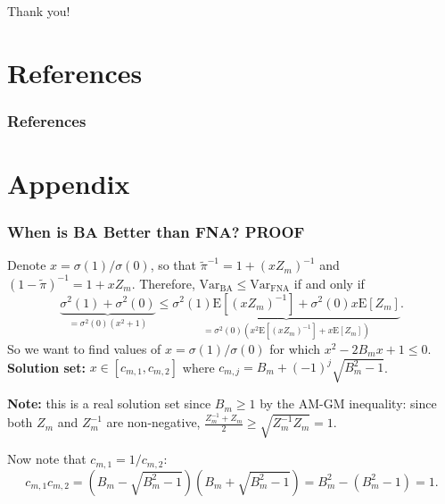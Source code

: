 \documentclass[aspectratio=169, 10pt]{beamer}
\theoremstyle{definition}
\theoremstyle{plain}
\def\E{\mathrm{E}}
\def\Var{\mathrm{Var}}
\def\FNA{\mathrm{FNA}}
\def\BA{\mathrm{BA}}
\begin{document}
\begin{frame}
\centering
\Large Thank you!
\end{frame}

\section*{References}

\begin{frame}
\frametitle{References}
{\sloppy \printbibliography}
\end{frame}

\section*{Appendix}

\begin{frame}
\frametitle{When is BA Better than FNA? PROOF
\hyperlink{frm--when-is-ba-better}{}}
\label{frm--prf--when-is-ba-better}
Denote \(x = \sigma (1) / \sigma (0)\), so that
\(\tilde{\pi}^{-1} = 1 + (x Z_{m})^{-1}\) and \((1 -
\tilde{\pi})^{-1} = 1 + x Z_{m}\).
Therefore, \(\Var_{\BA} \leq \Var_{\FNA}\) if and only if
\begin{equation*}
  \underbrace{\sigma^{2} (1) + \sigma^{2} (0)}_{= \sigma^{2} (0) (x^{2} + 1)}
  \leq \underbrace{\sigma^{2} (1) \E [(x Z_{m})^{-1}] +
  \sigma^{2} (0) x \E [Z_{m}]}_{= \sigma^{2} (0) (x^{2} \E [(x Z_{m})^{-1}] + x
  \E [Z_{m}])}.
\end{equation*}
So we want to find values of \(x = \sigma (1) / \sigma (0)\) for which
\(x^{2} - 2 B_{m} x + 1 \leq 0\).
\textbf{Solution set:}
\(x \in [c_{m, 1}, c_{m, 2}]\) where \(c_{m, j} = B_{m} + (- 1)^{j}
\sqrt{B_{m}^{2} - 1}\).

\hfill

\textbf{Note:} this is a real solution set since \(B_{m} \geq 1\) by the AM-GM
inequality: since both \(Z_{m}\) and \(Z_{m}^{- 1}\) are non-negative,
\(\frac{Z_{m}^{- 1} + Z_{m}}{2} \geq \sqrt{Z_{m}^{- 1} Z_{m}} = 1\).

\hfill

Now note that \(c_{m,1} = 1 / c_{m,2}\):
\begin{equation*}
  c_{m,1} c_{m,2} = (B_{m} - \sqrt{B_{m}^{2} - 1}) (B_{m} + \sqrt{B_{m}^{2} -
  1}) = B_{m}^{2} - (B_{m}^{2} - 1) = 1.
\end{equation*}
\end{frame}
\end{document}
